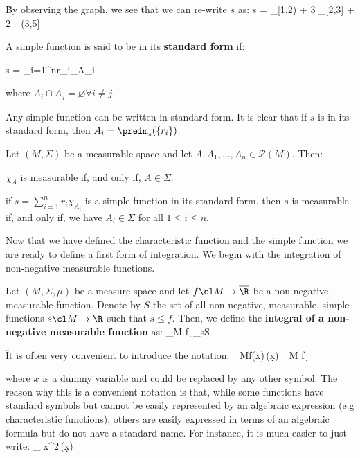 \v

By observing the graph, we see that we can re-write $s$ as:
\bse
s = \chi_{[1,2)} + 3 \chi_{[2,3]} + 2 \chi_{(3,5]}
\ese
\ee

A simple function is said to be in its \textbf{standard form} if:

\vspace{-5pt}

\bse
s = \sum_{i=1}^nr_i\chi_{A_i}
\ese

where $A_i \cap A_j = \varnothing \forall i\neq j$.
\ed

Any simple function can be written in standard form. It is clear that if $s$ is in its standard form, then $A_i =
\preim_s(\{r_i\})$.

\bt[]
Let $(M,\Sigma)$ be a measurable space and let $A,A_1,\ldots, A_n\in\mathscr{P}(M)$. Then:
\ben[label=(\roman*)]
\item $\chi_A$ is measurable if, and only if, $A\in\Sigma$.
\item if $s=\sum_{i=1}^n r_i \chi_{A_i}$ is a simple function in its standard form, then $s$ is measurable if, and
only if, we have $A_i\in \Sigma$ for all $1\leq i\leq n$.
\een
\et

Now that we have defined the characteristic function and the simple function we are ready to define a first form of
integration. We begin with the integration of non-negative measurable functions.

Let $(M,\Sigma,\mu)$ be a measure space and let $f\cl M\to\overline{\R}$ be a non-negative, measurable function.
Denote by $S$ the set of all non-negative, measurable, simple functions $s\cl M \to \R$ such that $s\leq f$. Then, we
define the \textbf{integral of a non-negative measurable function} as:
\bse
\int_M\! f\, \d \mu \coloneqq \sup_{s\in S} \left[ \sum_{i=1}^nr_i \mu (A_i) \right]
\ese
\ed

\v

It is often very convenient to introduce the notation:
\bse
\int_M\!f(x)\,\mu(\d x) \equiv \int_M\! f\, \d \mu
\ese

where $x$ is a dummy variable and could be replaced by any other symbol. The reason why this is a convenient notation
is that, while some functions have standard symbols but cannot be easily represented by an algebraic expression (e.g
characteristic functions), others are easily expressed in terms of an algebraic formula but do not have a standard
name. For instance, it is much easier to just write:
\bse
\int_{\R} x^2\,\mu(\d x)
\ese

